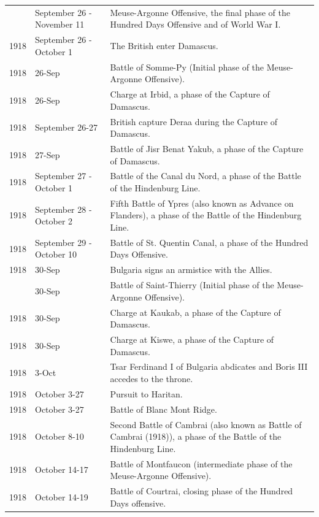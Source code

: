 \documentclass[
  openany]{book}
\begin{document}
\begin{longtable}[t]{rl>{\raggedright\arraybackslash}p{22em}}
\addlinespace
1918 & September 26 - November 11 & Meuse-Argonne Offensive, the final phase of the Hundred Days Offensive and of World War I.\\
\rowcolor{gray!6}  1918 & September 26 - October 1 & The British enter Damascus.\\
1918 & 26-Sep & Battle of Somme-Py (Initial phase of the Meuse-Argonne Offensive).\\
\rowcolor{gray!6}  1918 & 26-Sep & Charge at Irbid, a phase of the Capture of Damascus.\\
1918 & September 26-27 & British capture Deraa during the Capture of Damascus.\\
\addlinespace
\rowcolor{gray!6}  1918 & 27-Sep & Battle of Jisr Benat Yakub, a phase of the Capture of Damascus.\\
1918 & September 27 - October 1 & Battle of the Canal du Nord, a phase of the Battle of the Hindenburg Line.\\
\rowcolor{gray!6}  1918 & September 28 - October 2 & Fifth Battle of Ypres (also known as Advance on Flanders), a phase of the Battle of the Hindenburg Line.\\
1918 & September 29 - October 10 & Battle of St. Quentin Canal, a phase of the Hundred Days Offensive.\\
\rowcolor{gray!6}  1918 & 30-Sep & Bulgaria signs an armistice with the Allies.\\
\addlinespace
1918 & 30-Sep & Battle of Saint-Thierry (Initial phase of the Meuse-Argonne Offensive).\\
\rowcolor{gray!6}  1918 & 30-Sep & Charge at Kaukab, a phase of the Capture of Damascus.\\
1918 & 30-Sep & Charge at Kiswe, a phase of the Capture of Damascus.\\
\rowcolor{gray!6}  1918 & 3-Oct & Tsar Ferdinand I of Bulgaria abdicates and Boris III accedes to the throne.\\
1918 & October 3-27 & Pursuit to Haritan.\\
\addlinespace
\rowcolor{gray!6}  1918 & October 3-27 & Battle of Blanc Mont Ridge.\\
1918 & October 8-10 & Second Battle of Cambrai (also known as Battle of Cambrai (1918)), a phase of the Battle of the Hindenburg Line.\\
\rowcolor{gray!6}  1918 & October 14-17 & Battle of Montfaucon (intermediate phase of the Meuse-Argonne Offensive).\\
1918 & October 14-19 & Battle of Courtrai, closing phase of the Hundred Days offensive.\\

\end{longtable}
\end{document}
